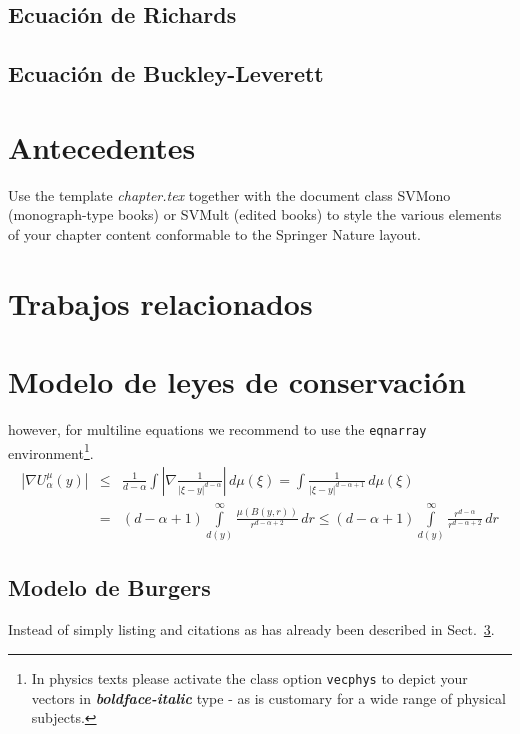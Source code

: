 \subsection*{Ecuación de Richards}

\subsection*{Ecuación de Buckley-Leverett}

\section{Antecedentes}
\label{sec:1}
Use the template \emph{chapter.tex} together with the document class SVMono (monograph-type books) or SVMult (edited books) to style the various elements of your chapter content conformable to the Springer Nature layout.

\section{Trabajos relacionados}
\section{Modelo de leyes de conservación}
\label{sec:2}

\eject

however, for multiline equations we recommend to use the \verb|eqnarray| environment\footnote{In physics texts please activate the class option \texttt{vecphys} to depict your vectors in \textbf{\itshape boldface-italic} type - as is customary for a wide range of physical subjects.}.
\begin{eqnarray}
    \left|\nabla U_{\alpha}^{\mu}(y)\right| &\le&\frac1{d-\alpha}\int
    \left|\nabla\frac1{|\xi-y|^{d-\alpha}}\right|\,d\mu(\xi) =
    \int \frac1{|\xi-y|^{d-\alpha+1}} \,d\mu(\xi)\qquad  \\
    &=&(d-\alpha+1) \int\limits_{d(y)}^\infty
    \frac{\mu(B(y,r))}{r^{d-\alpha+2}}\,dr \le (d-\alpha+1)
    \int\limits_{d(y)}^\infty \frac{r^{d-\alpha}}{r^{d-\alpha+2}}\,dr
    \label{eq:01}
\end{eqnarray}

\enlargethispage{24pt}

\subsection{Modelo de Burgers}
\label{subsec:2}
Instead of simply listing and citations as has already been described in Sect.~\ref{sec:2}.

